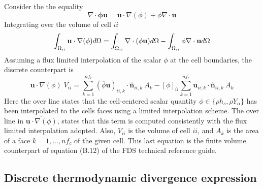 Consider the the equality
%
\begin{equation}
    \nabla \cdot \mathbf{\phi u} = \mathbf{u} \cdot \nabla (\phi) + \phi \nabla \cdot \mathbf{u} \label{eq:advforms}
\end{equation}
%
Integrating over the volume of cell $ii$
%
\begin{equation}
    \int_{\Omega_{ii}} {\mathbf{u} \cdot \nabla(\phi)} d\Omega =
    \int_{\Omega_{ii}} \nabla \cdot ({\phi} \mathbf{u}) d\Omega -
    \int_{\Omega_{ii}} \phi \nabla \cdot \mathbf{u} d\Omega \label{eq:flxlim1} \\
\end{equation}
Assuming a flux limited interpolation of the scalar $\phi$ at the cell boundaries, the discrete counterpart is
%
\begin{equation}
    \overline{\mathbf{u} \cdot \nabla(\phi)} \; V_{ii} =
    \sum_{k=1}^{nf_c} (\overline{\phi} \mathbf{u})_{ii,k} \cdot \hat{\mathbf{n}}_{ii,k} \: A_k -
    [\phi]_{ii} \sum_{k=1}^{nf_c} \mathbf{u}_{ii,k} \cdot \hat{\mathbf{n}}_{ii,k} \: A_k \label{eq:flxlim2}
\end{equation}
%
Here the over line states that the cell-centered scalar quantity $\phi \in \{\rho h_s, \rho Y_\alpha\}$ has been interpolated to the cells faces using a limited interpolation scheme. The over line in $\overline{\mathbf{u} \cdot \nabla(\phi)}$, states that this term is computed consistently with the flux limited interpolation adopted. Also, $V_{ii}$ is the volume of cell $ii$, and $A_k$ is the area of a face $k=1,...,nf_c$ of the given cell. This last equation is the finite volume counterpart of equation (B.12) of the FDS technical reference guide.

\subsection{Discrete thermodynamic divergence expression}

